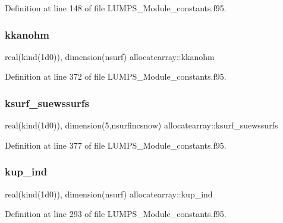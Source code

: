 Definition at line 148 of file L\+U\+M\+P\+S\+\_\+\+Module\+\_\+constants.\+f95.

\mbox{\label{namespaceallocatearray_a8055e207eb40afdc658bde6493ab319e}} 
\subsubsection{\texorpdfstring{kkanohm}{kkanohm}}
{\footnotesize\ttfamily real(kind(1d0)), dimension(nsurf) allocatearray\+::kkanohm}



Definition at line 372 of file L\+U\+M\+P\+S\+\_\+\+Module\+\_\+constants.\+f95.

\mbox{\label{namespaceallocatearray_ab18052a7670fb2dcb20cee408efee503}} 
\subsubsection{\texorpdfstring{ksurf\+\_\+suewssurfs}{ksurf\_suewssurfs}}
{\footnotesize\ttfamily real(kind(1d0)), dimension(5,nsurfincsnow) allocatearray\+::ksurf\+\_\+suewssurfs}



Definition at line 377 of file L\+U\+M\+P\+S\+\_\+\+Module\+\_\+constants.\+f95.

\mbox{\label{namespaceallocatearray_ad56cceda5c3f4f010df2d55ce5a8e031}} 
\subsubsection{\texorpdfstring{kup\+\_\+ind}{kup\_ind}}
{\footnotesize\ttfamily real(kind(1d0)), dimension(nsurf) allocatearray\+::kup\+\_\+ind}



Definition at line 293 of file L\+U\+M\+P\+S\+\_\+\+Module\+\_\+constants.\+f95.

\mbox{\label{namespaceallocatearray_a83fb7e3559abcc7dbd5eb41bea6b25d0}} 
